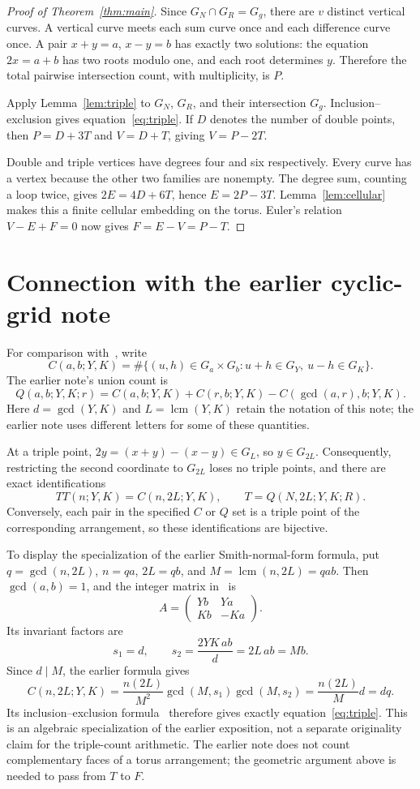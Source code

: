 \documentclass[a4paper,11pt]{article}
\begin{document}
\begin{proof}[Proof of Theorem~\ref{thm:main}]
Since $G_N\cap G_R=G_g$, there are $v$ distinct vertical curves. A vertical
curve meets each sum curve once and each difference curve once. A pair
$x+y=a$, $x-y=b$ has exactly two solutions: the equation $2x=a+b$ has
two roots modulo one, and each root determines $y$. Therefore the total
pairwise intersection count, with multiplicity, is $P$.

Apply Lemma~\ref{lem:triple} to $G_N$, $G_R$, and their intersection $G_g$.
Inclusion--exclusion gives equation~\eqref{eq:triple}. If $D$ denotes
the number of double points, then $P=D+3T$ and $V=D+T$, giving
$V=P-2T$.

Double and triple vertices have degrees four and six respectively. Every
curve has a vertex because the other two families are nonempty. The
degree sum, counting a loop twice, gives
$2E=4D+6T$, hence $E=2P-3T$. Lemma~\ref{lem:cellular} makes this a finite
cellular embedding on the torus. Euler's relation $V-E+F=0$ now gives
$F=E-V=P-T$.
\end{proof}

\section{Connection with the earlier cyclic-grid note}\label{sec:earlier}
For comparison with~\cite[Eq. (1)]{Walke2026}, write
\[
 C(a,b;Y,K)=\#\{(u,h)\in G_a\times G_b:
                  u+h\in G_Y,\ u-h\in G_K\}.
\]
The earlier note's union count is
\[
 Q(a,b;Y,K;r)=C(a,b;Y,K)+C(r,b;Y,K)
                         -C(\gcd(a,r),b;Y,K).
\]
Here $d=\gcd(Y,K)$ and $L=\operatorname{lcm}(Y,K)$ retain the
notation of this note; the earlier note uses different letters for some
of these quantities.

At a triple point, $2y=(x+y)-(x-y)\in G_L$, so $y\in G_{2L}$.
Consequently, restricting the second coordinate to $G_{2L}$ loses no
triple points, and there are exact identifications
\[
 TT(n;Y,K)=C(n,2L;Y,K),\qquad T=Q(N,2L;Y,K;R).
\]
Conversely, each pair in the specified $C$ or $Q$ set is a triple point
of the corresponding arrangement, so these identifications are bijective.

To display the specialization of the earlier Smith-normal-form formula,
put $q=\gcd(n,2L)$, $n=q a$, $2L=q b$, and
$M=\operatorname{lcm}(n,2L)=qab$. Then $\gcd(a,b)=1$, and the
integer matrix in~\cite[Eqs. (2)--(4)]{Walke2026} is
\[
 A=\begin{pmatrix}Yb&Ya\\Kb&-Ka\end{pmatrix}.
\]
Its invariant factors are
\[
 s_1=d,\qquad s_2=\frac{2YK\,ab}{d}=2L\,ab=Mb.
\]
Since $d\mid M$, the earlier formula gives
\[
 C(n,2L;Y,K)
 =\frac{n(2L)}{M^2}\gcd(M,s_1)\gcd(M,s_2)
 =\frac{n(2L)}{M}d=dq.
\]
Its inclusion--exclusion formula~\cite[Corollary 1, Eq. (8)]{Walke2026}
therefore gives exactly equation~\eqref{eq:triple}. This is an algebraic
specialization of the earlier exposition, not a separate originality
claim for the triple-count arithmetic. The earlier note does not count
complementary faces of a torus arrangement; the geometric argument above
is needed to pass from $T$ to $F$.
\end{document}
